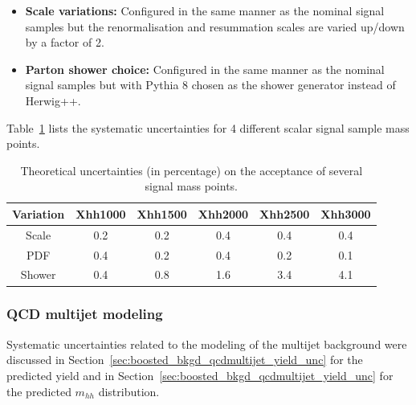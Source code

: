 \begin{itemize}
\item \textbf{Scale variations:} Configured in the same manner as the nominal signal samples but
the renormalisation and resummation scales are varied up/down by a factor of 2.
 
 
\item \textbf{Parton shower choice:} Configured in the same manner as the nominal signal samples but
with Pythia 8 chosen as the shower generator instead of Herwig++.
\end{itemize}
 
Table~\ref{tab:boosted_unc_signal} lists the systematic uncertainties for 4 different scalar signal sample
mass points.
 
\begin{table}[htbp!]
\begin{center}
\begin{tabular}{c|c|c|c|c|c}
Variation    &  Xhh1000  &  Xhh1500 & Xhh2000 & Xhh2500 & Xhh3000   \\
\hline
Scale        &    0.2    &    0.2   &  0.4    &  0.4   &  0.4  \\
PDF          &    0.4    &    0.2   &  0.4    &  0.2   &  0.1  \\
Shower       &    0.4    &    0.8   &  1.6    &  3.4   &  4.1  \\
\end{tabular}
\end{center}
\caption{Theoretical uncertainties (in percentage) on the acceptance of several signal mass points.}
\label{tab:boosted_unc_signal}
 
 
\end{table}
\subsubsection{QCD multijet modeling}
\label{sec:boosted_syst_modeling_multijet}
 
Systematic uncertainties related to the modeling of the multijet background were discussed in Section~\ref{sec:boosted_bkgd_qcdmultijet_yield_unc}
for the predicted yield and in Section~\ref{sec:boosted_bkgd_qcdmultijet_yield_unc} for the predicted $m_{hh}$ distribution.